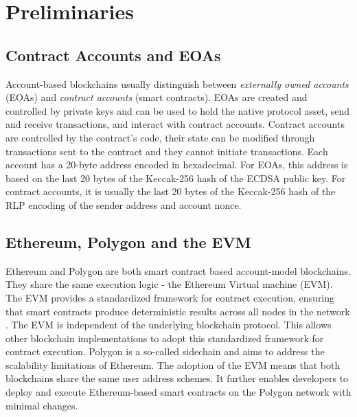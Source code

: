 \documentclass[12pt,a4paper,titlepage,oneside,english]{article}
\begin{document}

\section{Preliminaries}
\subsection{Contract Accounts and EOAs}
Account-based blockchains usually distinguish between \textit{externally owned accounts} (EOAs) and \textit{contract accounts} (smart contracts). EOAs are created and controlled by private keys and can be used to hold the native protocol asset, send and receive transactions, and interact with contract accounts. Contract accounts are controlled by the contract's code, their state can be modified through transactions sent to the contract and they cannot initiate transactions. \citep{buterin2014ethereum} \newline Each account has a 20-byte address encoded in hexadecimal. For EOAs, this address is based on the last 20 bytes of the Keccak-256 hash of the ECDSA public key. For contract accounts, it is usually the last 20 bytes of the Keccak-256 hash of the RLP encoding of the sender address and account nonce. \citep{GW:14}

\subsection{Ethereum, Polygon and the EVM}
Ethereum and Polygon are both smart contract based account-model blockchains. They share the same execution logic - the Ethereum Virtual machine (EVM).
The EVM provides a standardized framework for contract execution, ensuring that smart contracts produce deterministic results across all nodes in the network \citep{GW:14}. The EVM is independent of the underlying blockchain protocol. This allows other blockchain implementations to adopt this standardized framework for contract execution.\newline
Polygon is a so-called sidechain and aims to address the scalability limitations of Ethereum. The adoption of the EVM means that both blockchains share the same user address schemes. It further enables developers to deploy and execute Ethereum-based smart contracts on the Polygon network with minimal changes. \citep{matic_whitepaper}
\end{document}
